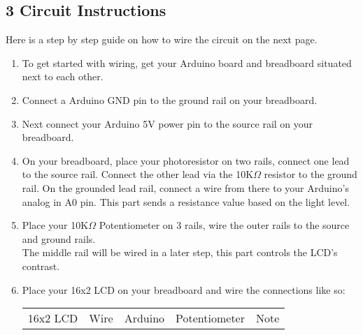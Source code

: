 \documentclass{article}
\newcommand{\enterProblemHeader}[1]{
}
\newcommand{\exitProblemHeader}[1]{
}
\newcounter{partCounter}
\newcounter{homeworkProblemCounter}
\newenvironment{homeworkProblem}[1]{
    \setcounter{partCounter}{1}
}{
}
\begin{document}

\begin{homeworkProblem}{}
    \vspace{-20pt}\subsection{3 Circuit Instructions}
    \vspace{-5pt}Here is a step by step guide on how to wire the circuit on the next page.
    \begin{enumerate}
        \item
        To get started with wiring, get your Arduino board and breadboard situated next
        to each other.
        \item \vspace{-5pt}
        Connect a Arduino GND pin to the ground rail on your breadboard.
        \item \vspace{-5pt}
        Next connect your Arduino 5V power pin to the source rail on your breadboard.
        \item \vspace{-5pt}
        On your breadboard, place your photoresistor on two rails, connect one lead to 
        the source rail. Connect the other lead via the 10K$\Omega$ resistor to the
        ground rail. On the grounded lead rail, connect a wire from there to your
        Arduino's analog in A0 pin. This part sends a resistance value based on the
        light level.
        \item \vspace{-5pt}
        Place your 10K$\Omega$ Potentiometer on 3 rails, wire the outer rails to the 
        source and ground rails. \\The middle rail will be wired in a later step, this
        part controls the LCD's contrast.
        \item \vspace{-5pt}
        Place your 16x2 LCD on your breadboard and wire the connections like so: \\
        \begin{tabularx}{0.9\textwidth} { 
            | >{\centering\arraybackslash}X 
            | >{\centering\arraybackslash}X 
            | >{\centering\arraybackslash}X 
            | >{\centering\arraybackslash}X 
            | >{\centering\arraybackslash}X | }
            \hline 16x2 LCD & Wire & Arduino & Potentiometer & Note \\

\end{tabularx}
\end{enumerate}
\end{homeworkProblem}
\end{document}
